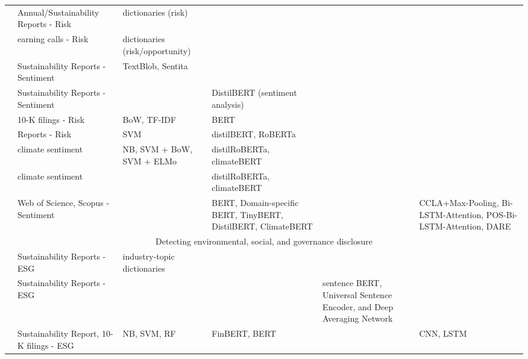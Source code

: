 \begin{longtable}[c]{lp{3cm}p{1.5cm}p{3cm}p{1.5cm}p{3cm}}
    \citet{kheradmand2021a} & \raggedright Annual/Sustainability Reports  - Risk &  dictionaries (risk) &  &  &  \\

    \citet{SAUTNER_cliamte_change_exp} & \raggedright earning calls  - Risk &  dictionaries (risk/opportunity) &  &  &  \\

    \citet{marco_polignano_nlp_2022} & \raggedright Sustainability Reports  - Sentiment &  TextBlob, Sentita &  &  &  \\

    \citet{hyewon_kang_analyzing_2022} & \raggedright Sustainability Reports  - Sentiment &   & DistilBERT (sentiment analysis) &  &  \\

    \citet{kolbel_ask_2021} & \raggedright 10-K filings - Risk &  BoW, TF-IDF & BERT &  &  \\

    \citet{Friederich_climate_risk_disclosure} & \raggedright Reports - Risk &  SVM & distilBERT, RoBERTa &  &  \\

    \citet{bingler2023cheaptalkspecificitysentiment} & \raggedright climate sentiment &  NB, SVM + BoW, SVM + ELMo & distilRoBERTa, climateBERT &  &  \\

    \citet{nicolas_webersinke_climatebert_2021} & \raggedright climate sentiment &   & distilRoBERTa, climateBERT &  &  \\

    \citet{xiang_dare_2023} & \raggedright Web of Science, Scopus - Sentiment &   & BERT, Domain-specific BERT, TinyBERT, DistilBERT, ClimateBERT &  & CCLA+Max-Pooling, Bi-LSTM-Attention, POS-Bi-LSTM-Attention, DARE \\

    \multicolumn{6}{c}{Detecting environmental, social, and governance disclosure} \\
\midrule
    \citet{rouenEvolutionESGReports2023} & \raggedright Sustainability Reports  - ESG  & industry-topic dictionaries &  &  &  \\

    \citet{Mehra_2022} & \raggedright Sustainability Reports  - ESG &  &   & {\tiny sentence BERT, Universal Sentence Encoder, and Deep Averaging Network} &  \\

    \citet{huangFinBERTLargeLanguage2020} & \raggedright Sustainability Report, 10-K filings - ESG &  NB, SVM, RF & FinBERT, BERT &  & CNN, LSTM \\


\end{longtable}
